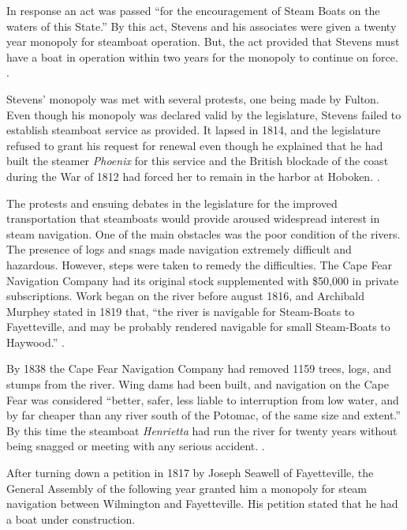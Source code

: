 \documentclass[11pt, a5paper, openright]{book}
\newcommand{\steamer}[1]{\textit{#1}\index{#1,~steamer}}
\begin{document}
In response an act was passed ``for the encouragement of Steam Boats
on the waters of this State.''  By this act, Stevens and his
associates were given a twenty year monopoly for steamboat operation.
But, the act provided that Stevens must have a boat in operation
within two years for the monopoly to continue on force.
\citep[12]{sloanth}.\par

Stevens' monopoly was met with several protests, one being made by
Fulton.  Even though his monopoly was declared valid by the
legislature, Stevens failed to establish steamboat service as
provided.  It lapsed in 1814, and the legislature refused to grant his
request for renewal even though he explained that he had built the
steamer \textit{Phoenix} for this service and the British blockade of
the coast during the War of 1812 had forced her to remain in the
harbor at Hoboken.  \citep[1-3]{turlingtonsw}.\par

The protests and ensuing debates in the legislature for the improved
transportation that steamboats would provide aroused widespread
interest in steam navigation.  One of the main obstacles was the poor
condition of the rivers.  The presence of logs and snags made
navigation extremely difficult and hazardous.  However, steps were
taken to remedy the difficulties.  The Cape Fear Navigation Company
had its original stock supplemented with \$50,000 in private
subscriptions.  Work began on the river before august 1816, and
Archibald Murphey stated in 1819 that, ``the river is navigable for
Steam-Boats to Fayetteville, and may be probably rendered navigable
for small Steam-Boats to Haywood.''  \citep[7, 11]{turlingtonsw}.\par

By 1838 the Cape Fear Navigation Company had removed 1159 trees, logs,
and stumps from the river.  Wing dams had been built, and navigation
on the Cape Fear was considered ``better, safer, less liable to
interruption from low water, and by far cheaper than any river south
of the Potomac, of the same size and extent.''  By this time the
steamboat \steamer{Henrietta} had run the river for twenty years
without being snagged or meeting with any serious accident.
\citep[12, 13]{turlingtonsw}.\par

After turning down a petition in 1817 by Joseph
Seawell of Fayetteville, the General Assembly
of the following year granted him a monopoly for steam navigation
between Wilmington and Fayetteville.  His petition stated that he had
a boat under construction.\par
\end{document}
